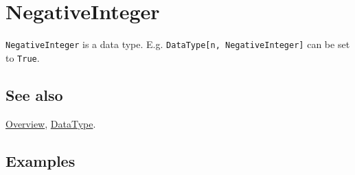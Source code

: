 \documentclass[../FeynCalcManual.tex]{subfiles}
\begin{document}
\hypertarget{negativeinteger}{%
\section{NegativeInteger}\label{negativeinteger}}

\texttt{NegativeInteger} is a data type. E.g.
\texttt{DataType[\allowbreak{}n,\ \allowbreak{}NegativeInteger]} can be
set to \texttt{True}.

\subsection{See also}

\hyperlink{toc}{Overview}, \hyperlink{datatype}{DataType}.

\subsection{Examples}
\end{document}
